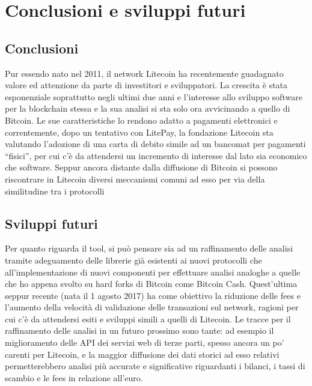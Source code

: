 \chapter{Conclusioni e sviluppi futuri}

\section{Conclusioni}
Pur essendo nato nel 2011, il network Litecoin ha recentemente guadagnato valore ed attenzione da parte di investitori e sviluppatori. La crescita è stata esponenziale soprattutto negli ultimi due anni e l’interesse allo sviluppo software per la blockchain stessa e la sua analisi si sta solo ora avvicinando a quello di Bitcoin. Le sue caratteristiche lo rendono adatto a pagamenti elettronici e correntemente, dopo un tentativo con LitePay, la fondazione Litecoin sta valutando l’adozione di una carta di debito simile ad un bancomat per pagamenti “fisici”, per cui c’è da attendersi un incremento di interesse dal lato sia economico che software.
Seppur ancora distante dalla diffusione di Bitcoin si possono riscontrare in Litecoin diversi meccanismi comuni ad esso per via della similitudine tra i protocolli


\section{Sviluppi futuri}

Per quanto riguarda il tool, si può pensare sia ad un raffinamento delle analisi tramite adeguamento delle librerie già esistenti ai nuovi protocolli che all'implementazione di nuovi componenti per effettuare analisi analoghe a quelle che ho appena svolto su hard forks di Bitcoin come Bitcoin Cash. Quest’ultima seppur recente (nata il 1 agosto 2017) ha come obiettivo la riduzione delle fees e l’aumento della velocità di validazione delle transazioni sul network, ragioni per cui c’è da attendersi esiti e sviluppi simili a quelli di Litecoin.
Le tracce per il raffinamento delle analisi in un futuro prossimo sono tante: ad esempio il miglioramento delle API dei servizi web di terze parti, spesso ancora un po' carenti per Litecoin, e la maggior diffusione dei dati storici ad esso relativi permetterebbero analisi più accurate e significative riguardanti i bilanci, i tassi di scambio e le fees in relazione all'euro.
